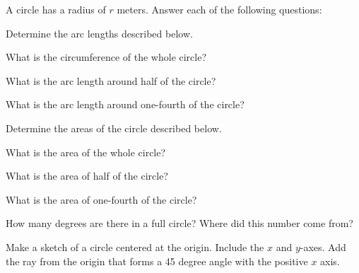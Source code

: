 
\begin{problem}
\item A circle has a radius of $r$ meters. Answer each of the
  following questions:
  \begin{subproblem}
  \item Determine the arc lengths described below.
    \begin{subsubproblem}
    \item What is the circumference of the whole circle?
      \vfill
    \item What is the arc length around half of the circle?
      \vfill
    \item What is the arc length around one-fourth of the circle?
      \vfill
    \end{subsubproblem}
  \item Determine the areas of the circle described below.
    \begin{subsubproblem}
    \item What is the area of the whole circle?
      \vfill
    \item What is the area of half of the circle?
      \vfill
    \item What is the area of one-fourth of the circle?
      \vfill
    \end{subsubproblem}
  \item How many degrees are there in a full circle? Where did this
    number come from?
    \vfill
  \item Make a sketch of a circle centered at the origin. Include the
    $x$ and $y$-axes. Add the ray from the origin that forms a 45
    degree angle with the positive $x$ axis.
    \vfill
    \vfill
  \end{subproblem}
\end{problem}


